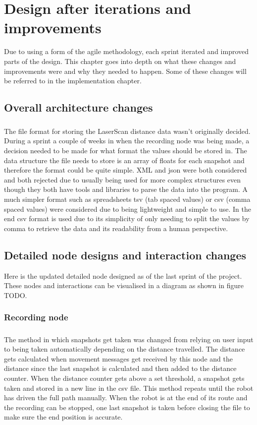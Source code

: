 \chapter{Design after iterations and improvements}

Due to using a form of the agile methodology, each sprint iterated and improved parts of the design. This chapter goes into depth on what these changes and improvements were and why they needed to happen. Some of these changes will be referred to in the implementation chapter.

\section{Overall architecture changes}
\paragraph{}
The file format for storing the LaserScan distance data wasn't originally decided. During a sprint a couple of weeks in when the recording node was being made, a decision needed to be made for what format the values should be stored in. The data structure the file needs to store is an array of floats for each snapshot and therefore the format could be quite simple. XML and json were both considered and both rejected due to usually being used for more complex structures even though they both have tools and libraries to parse the data into the program. A much simpler format such as spreadsheets tsv (tab spaced values) or csv (comma spaced values) were considered due to being lightweight and simple to use. In the end csv format is used due to its simplicity of only needing to split the values by comma to retrieve the data and its readability from a human perspective.

\section{Detailed node designs and interaction changes}
Here is the updated detailed node designed as of the last sprint of the project. These nodes and interactions can be visualised in a diagram as shown in figure TODO.
\subsection{Recording node}
\paragraph{}
The method in which snapshots get taken was changed from relying on user input to being taken automatically depending on the distance travelled. The distance gets calculated when movement messages get received by this node and the distance since the last snapshot is calculated and then added to the distance counter. When the distance counter gets above a set threshold, a snapshot gets taken and stored in a new line in the csv file. This method repeats until the robot has driven the full path manually. When the robot is at the end of its route and the recording can be stopped, one last snapshot is taken before closing the file to make sure the end position is accurate.

